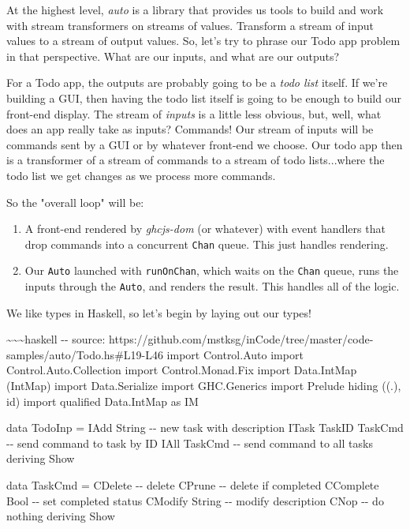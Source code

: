 \documentclass[]{article}
\begin{document}
At the highest level, \emph{auto} is a library that provides us tools to build
and work with stream transformers on streams of values. Transform a stream of
input values to a stream of output values. So, let's try to phrase our Todo app
problem in that perspective. What are our inputs, and what are our outputs?

For a Todo app, the outputs are probably going to be a \emph{todo list} itself.
If we're building a GUI, then having the todo list itself is going to be enough
to build our front-end display. The stream of \emph{inputs} is a little less
obvious, but, well, what does an app really take as inputs? Commands! Our stream
of inputs will be commands sent by a GUI or by whatever front-end we choose. Our
todo app then is a transformer of a stream of commands to a stream of todo
lists...where the todo list we get changes as we process more commands.

So the "overall loop" will be:

\begin{enumerate}
\tightlist
\item
  A front-end rendered by \emph{ghcjs-dom} (or whatever) with event handlers
  that drop commands into a concurrent \texttt{Chan} queue. This just handles
  rendering.
\item
  Our \texttt{Auto} launched with \texttt{runOnChan}, which waits on the
  \texttt{Chan} queue, runs the inputs through the \texttt{Auto}, and renders
  the result. This handles all of the logic.
\end{enumerate}

We like types in Haskell, so let's begin by laying out our types!

\textasciitilde{}\textasciitilde{}\textasciitilde{}haskell -\/- source:
https://github.com/mstksg/inCode/tree/master/code-samples/auto/Todo.hs\#L19-L46
import Control.Auto import Control.Auto.Collection import Control.Monad.Fix
import Data.IntMap (IntMap) import Data.Serialize import GHC.Generics import
Prelude hiding ((.), id) import qualified Data.IntMap as IM

data TodoInp = IAdd String -\/- new task with description \textbar{} ITask
TaskID TaskCmd -\/- send command to task by ID \textbar{} IAll TaskCmd -\/- send
command to all tasks deriving Show

data TaskCmd = CDelete -\/- delete \textbar{} CPrune -\/- delete if completed
\textbar{} CComplete Bool -\/- set completed status \textbar{} CModify String
-\/- modify description \textbar{} CNop -\/- do nothing deriving Show
\end{document}
